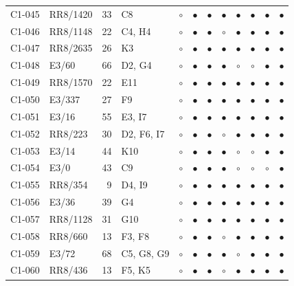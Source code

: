 {\begin{longtable}{llrp{3.9cm}cccccccc}
    C1-045 & RR8/1420 & 33 & C8 & $\circ$ & $\bullet$ & $\bullet$ & $\bullet$ & $\bullet$ & $\bullet$ & $\bullet$ & $\bullet$ \\
    C1-046 & RR8/1148 & 22 & C4, H4 & $\circ$ & $\bullet$ & $\bullet$ & $\circ$ & $\bullet$ & $\bullet$ & $\bullet$ & $\bullet$ \\
    C1-047 & RR8/2635 & 26 & K3 & $\circ$ & $\bullet$ & $\bullet$ & $\bullet$ & $\bullet$ & $\bullet$ & $\bullet$ & $\bullet$ \\
    C1-048 & E3/60 & 66 & D2, G4 & $\circ$ & $\bullet$ & $\bullet$ & $\bullet$ & $\circ$ & $\circ$ & $\bullet$ & $\bullet$ \\
    C1-049 & RR8/1570 & 22 & E11 & $\circ$ & $\bullet$ & $\bullet$ & $\bullet$ & $\bullet$ & $\bullet$ & $\bullet$ & $\bullet$ \\
    C1-050 & E3/337 & 27 & F9 & $\circ$ & $\bullet$ & $\bullet$ & $\bullet$ & $\bullet$ & $\bullet$ & $\bullet$ & $\bullet$ \\
    C1-051 & E3/16 & 55 & E3, I7 & $\circ$ & $\bullet$ & $\bullet$ & $\bullet$ & $\bullet$ & $\bullet$ & $\bullet$ & $\bullet$ \\
    C1-052 & RR8/223 & 30 & D2, F6, I7 & $\circ$ & $\bullet$ & $\bullet$ & $\circ$ & $\bullet$ & $\bullet$ & $\bullet$ & $\bullet$ \\
    C1-053 & E3/14 & 44 & K10 & $\circ$ & $\bullet$ & $\bullet$ & $\bullet$ & $\circ$ & $\circ$ & $\bullet$ & $\bullet$ \\
    C1-054 & E3/0 & 43 & C9 & $\circ$ & $\bullet$ & $\bullet$ & $\bullet$ & $\circ$ & $\circ$ & $\circ$ & $\bullet$ \\
    C1-055 & RR8/354 & 9 & D4, I9 & $\circ$ & $\bullet$ & $\bullet$ & $\bullet$ & $\bullet$ & $\bullet$ & $\bullet$ & $\bullet$ \\
    C1-056 & E3/36 & 39 & G4 & $\circ$ & $\bullet$ & $\bullet$ & $\bullet$ & $\bullet$ & $\bullet$ & $\bullet$ & $\bullet$ \\
    C1-057 & RR8/1128 & 31 & G10 & $\circ$ & $\bullet$ & $\bullet$ & $\bullet$ & $\bullet$ & $\bullet$ & $\bullet$ & $\bullet$ \\
    C1-058 & RR8/660 & 13 & F3, F8 & $\circ$ & $\bullet$ & $\bullet$ & $\circ$ & $\bullet$ & $\bullet$ & $\bullet$ & $\bullet$ \\
    C1-059 & E3/72 & 68 & C5, G8, G9 & $\circ$ & $\bullet$ & $\bullet$ & $\bullet$ & $\circ$ & $\bullet$ & $\bullet$ & $\bullet$ \\
    C1-060 & RR8/436 & 13 & F5, K5 & $\circ$ & $\bullet$ & $\bullet$ & $\circ$ & $\bullet$ & $\bullet$ & $\bullet$ & $\bullet$ \\

\end{longtable}}
